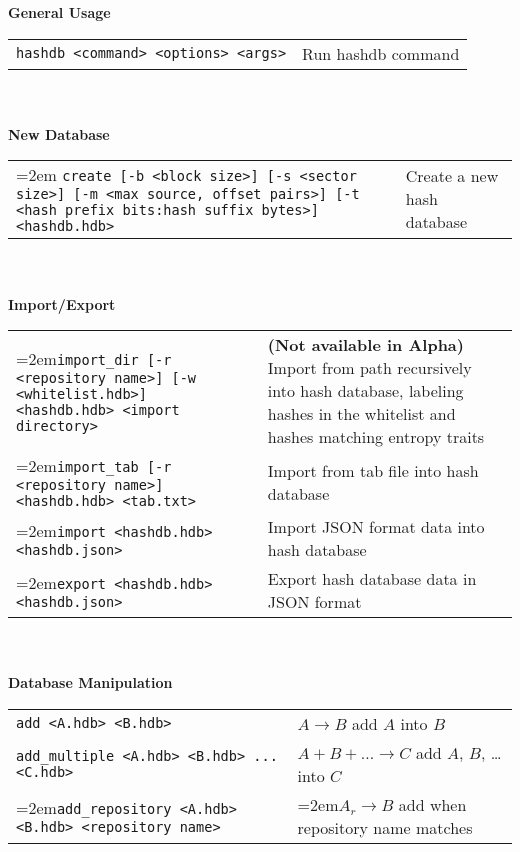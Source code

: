 \begin{footnotesize}
\textbf{General Usage} \\
\begin{tabular}{p{3.6 in} p{3.0 in}}
\texttt{hashdb <command> <options> <args>} & Run hashdb command \\
\end{tabular}
\\
\\
\textbf{New Database} \\
\begin{tabular}{p{3.6 in} p{3.0 in}}
\hangindent=2em \texttt{create [-b <block size>] [-s <sector size>] [-m <max source, offset pairs>] [-t <hash prefix bits:hash suffix bytes>] <hashdb.hdb>} &
Create a new hash database \\
\end{tabular}
\\
\\
\textbf{Import/Export} \\
\begin{tabular}{p{3.6 in} p{3.0 in}}
\hangindent=2em\texttt{import\_dir [-r <repository name>] [-w <whitelist.hdb>] <hashdb.hdb> <import directory>} &
\textbf{(Not available in Alpha)} Import from path recursively into hash database, labeling hashes in the whitelist and hashes matching entropy traits \\
\hangindent=2em\texttt{import\_tab [-r <repository name>] <hashdb.hdb> <tab.txt>} &
Import from tab file into hash database \\
\hangindent=2em\texttt{import <hashdb.hdb> <hashdb.json>} &
Import JSON format data into hash database \\
\hangindent=2em\texttt{export <hashdb.hdb> <hashdb.json>} &
Export hash database data in JSON format \\
\end{tabular}
\\
\\
\textbf{Database Manipulation} \\
\begin{tabular}{p{3.6 in} p{3.0 in}}
\texttt{add <A.hdb> <B.hdb>} & $A \rightarrow B$ add $A$ into $B$ \\
\texttt{add\_multiple <A.hdb> <B.hdb> ... <C.hdb>} & $A + B + \ldots \rightarrow C$ add $A$, $B$, \ldots into $C$\\
\hangindent=2em\texttt{add\_repository <A.hdb> <B.hdb> <repository name>} & \hangindent=2em$A_r \rightarrow B$ add when repository name matches \\

\end{tabular}
\end{footnotesize}
